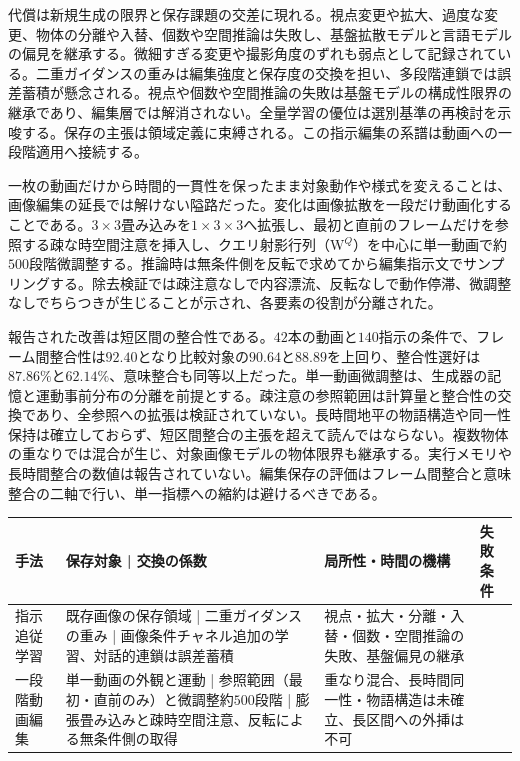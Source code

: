 \documentclass[lualatex,a4paper,10pt]{jlreq}
\begin{document}
代償は新規生成の限界と保存課題の交差に現れる。視点変更や拡大、過度な変更、物体の分離や入替、個数や空間推論は失敗し、基盤拡散モデルと言語モデルの偏見を継承する\autocite{btd049}。微細すぎる変更や撮影角度のずれも弱点として記録されている。二重ガイダンスの重みは編集強度と保存度の交換を担い、多段階連鎖では誤差蓄積が懸念される\autocite{btd049}。視点や個数や空間推論の失敗は基盤モデルの構成性限界の継承であり、編集層では解消されない。全量学習の優位は選別基準の再検討を示唆する。保存の主張は領域定義に束縛される\autocite{btd049}。この指示編集の系譜は動画への一段階適用へ接続する\autocite{btd049,btd050}。

一枚の動画だけから時間的一貫性を保ったまま対象動作や様式を変えることは、画像編集の延長では解けない隘路だった\autocite{btd050}。変化は画像拡散を一段だけ動画化することである。$3 \times 3$畳み込みを$1 \times 3 \times 3$へ拡張し、最初と直前のフレームだけを参照する疎な時空間注意を挿入し、クエリ射影行列（W$^Q$）を中心に単一動画で約$500$段階微調整する\autocite{btd050}。推論時は無条件側を反転で求めてから編集指示文でサンプリングする。除去検証では疎注意なしで内容漂流、反転なしで動作停滞、微調整なしでちらつきが生じることが示され、各要素の役割が分離された\autocite{btd050}。

報告された改善は短区間の整合性である。$42$本の動画と$140$指示の条件で、フレーム間整合性は$92.40$となり比較対象の$90.64$と$88.89$を上回り、整合性選好は$87.86\%$と$62.14\%$、意味整合も同等以上だった\autocite{btd050}。単一動画微調整は、生成器の記憶と運動事前分布の分離を前提とする。疎注意の参照範囲は計算量と整合性の交換であり、全参照への拡張は検証されていない\autocite{btd050}。長時間地平の物語構造や同一性保持は確立しておらず、短区間整合の主張を超えて読んではならない。複数物体の重なりでは混合が生じ、対象画像モデルの物体限界も継承する\autocite{btd050}。実行メモリや長時間整合の数値は報告されていない。編集保存の評価はフレーム間整合と意味整合の二軸で行い、単一指標への縮約は避けるべきである\autocite{btd050}。

\begin{center}
\small
\begin{tabularx}{\textwidth}{@{}p{}p{}p{}X@{}}
\toprule
手法 & 保存対象 | 交換の係数 & 局所性・時間の機構 & 失敗条件 \\
\midrule
指示追従学習\autocite{btd049} & 既存画像の保存領域 | 二重ガイダンスの重み | 画像条件チャネル追加の学習、対話的連鎖は誤差蓄積 & 視点・拡大・分離・入替・個数・空間推論の失敗、基盤偏見の継承 \\
一段階動画編集\autocite{btd050} & 単一動画の外観と運動 | 参照範囲（最初・直前のみ）と微調整約$500$段階 | 膨張畳み込みと疎時空間注意、反転による無条件側の取得 & 重なり混合、長時間同一性・物語構造は未確立、長区間への外挿は不可 \\
\bottomrule
\end{tabularx}
\end{center}
\end{document}
